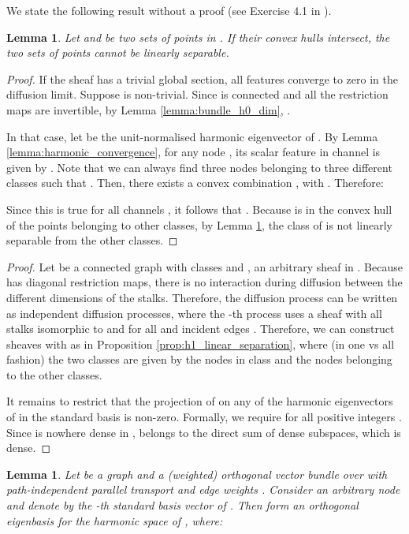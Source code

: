 \documentclass{article}
\newtheorem{lemma}[theorem]{Lemma}
\begin{document}
We state the following result without a proof (see Exercise 4.1 in \citet{bishop}).  

\begin{lemma}\label{lemma:convex_hull_separability}
Let  and  be two sets of points in . If their convex hulls intersect, the two sets of points cannot be linearly separable. 
\end{lemma}

\ImpossibleSeparation*
\begin{proof}
If the sheaf has a trivial global section, all features converge to zero in the diffusion limit. Suppose  is non-trivial. Since  is connected and all the restriction maps are invertible, by Lemma \ref{lemma:bundle_h0_dim}, . 

In that case, let  be the unit-normalised harmonic eigenvector of . By Lemma \ref{lemma:harmonic_convergence}, for any node , its scalar feature in channel  is given by . Note that we can always find three nodes  belonging to three different classes such that . Then, there exists a convex combination , with . Therefore:

Since this is true for all channels , it follows that . Because  is in the convex hull of the points belonging to other classes, by Lemma \ref{lemma:convex_hull_separability}, the class of  is not linearly separable from the other classes.  
\end{proof}

\DiagSeparation*
\begin{proof}
Let  be a connected graph with  classes and , an arbitrary sheaf in . Because  has diagonal restriction maps, there is no interaction during diffusion between the different dimensions of the stalks. Therefore, the diffusion process can be written as  independent diffusion processes, where the -th process uses a sheaf  with all stalks isomorphic to  and  for all  and incident edges . Therefore, we can construct  sheaves  with  as in Proposition \ref{prop:h1_linear_separation}, where (in one vs all fashion) the two classes are given by the nodes in class  and the nodes belonging to the other classes. 

It remains to restrict that the projection of  on any of the harmonic eigenvectors of  in the standard basis is non-zero. Formally, we require  for all positive integers . Since  is nowhere dense in ,  belongs to the direct sum of dense subspaces, which is dense. 
\end{proof}

\begin{lemma}\label{lemma:orth_bundle_0eigenspace}
Let  be a graph and  a (weighted) orthogonal vector bundle over  with path-independent parallel transport and edge weights . Consider an arbitrary node  and denote by  the -th standard basis vector of . Then  form an orthogonal eigenbasis for the harmonic space of , where:

\end{lemma}
\end{document}
